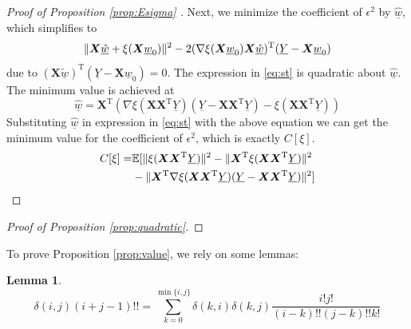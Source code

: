 \documentclass[conference,letterpaper]{IEEEtran}
\newtheorem{lemma}{Lemma}
\DeclarePairedDelimiter\norm{\lVert}{\rVert}
\def\E{\mathbb{E}}
\def\T{\mathrm{T}}
\begin{document}
\begin{proof}[Proof of Proposition \ref{prop:Esigma} ]
Next, we minimize the coefficient of $\epsilon^2$ by $\underline{\hat{w}}$, which simplifies to 
\begin{equation}\label{eq:st}
\norm{\bm{X}\underline{\hat{w}} + \xi(\bm{X} \underline{w}_0)}^2-
2 (
\nabla \xi(\bm{X} \underline{w}_0)\bm{X}\underline{\hat{w}})^\T(\underline{Y}-\bm{X} \underline{w}_0)
\end{equation}
due to $(\bm{X}\underline{\tilde{w}})^\T (\underline{Y}-\bm{X}\underline{w}_0) = 0 $.
The expression in \eqref{eq:st} is quadratic about $\underline{\hat{w}}$. The minimum value is achieved  at
$$
\underline{\hat{w}} =  \bm{X}^\T(\nabla\xi(\bm{X}\bm{X}^\T \underline{Y})
(\underline{Y}-\bm{X}\bm{X}^\T \underline{Y}) - \xi(\bm{X}\bm{X}^\T \underline{Y}))
$$
Substituting $\underline{\hat{w}}$ in expression in \eqref{eq:st} with the above equation we can get the minimum value for the coefficient of $\epsilon^2$, which is exactly $C[\xi]$.
\begin{align*}
C[\xi] = & \E[\norm{\xi(\bm{X}\bm{X}^\T\underline{Y})}^2 -
\norm{\bm{X}^\T\xi(\bm{X}\bm{X}^\T\underline{Y})}^2 \\
& -
\norm{\bm{X}^\T \nabla\xi(\bm{X}\bm{X}^\T\underline{Y})(\underline{Y}-\bm{X}\bm{X}^\T\underline{Y})}^2]
\end{align*}
\end{proof}
\begin{proof}[Proof of Proposition \ref{prop:quadratic}]
\end{proof}
To prove Proposition \ref{prop:value}, we rely on some lemmas:
\begin{lemma}\label{lemma:UUN}
\begin{equation}\label{eq:UUN}
\delta(i, j) (i+j-1)!! = \sum_{k=0}^{\min\{i, j\}}
\delta(k, i) \delta(k, j) \frac{i! j!}{(i-k)!!(j-k)!! k!}
\end{equation}
\end{lemma}
\end{document}
